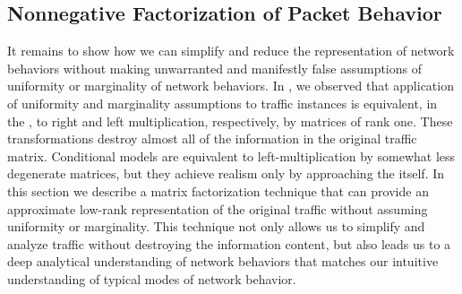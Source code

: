 \documentclass[twocolumn,final]{svjour3}
\begin{document}
\subsection{Nonnegative Factorization of Packet Behavior}




It remains to show how we can simplify and reduce the representation of network behaviors without making unwarranted and manifestly false assumptions of uniformity or marginality of network behaviors.
In , we observed that application of uniformity and marginality assumptions to traffic instances is equivalent, in the , to right and left multiplication, respectively, by matrices of rank one. These transformations destroy almost all of the information in the original traffic matrix.
Conditional models are equivalent to left-multiplication by somewhat less degenerate matrices, but they achieve realism only by approaching the  itself.
In this section we describe a matrix factorization technique that can provide an approximate low-rank representation of the original traffic without assuming uniformity or marginality.
This technique not only allows us to simplify and analyze traffic without destroying the information content, but also leads us to a deep analytical understanding of network behaviors that matches our intuitive understanding of typical modes of network behavior.
\end{document}
